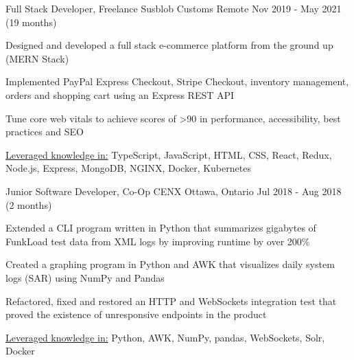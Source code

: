 \begin{cventries}
{\begin{cvitems}
		\end{cvitems}
	}
	\cventry
	{Full Stack Developer, Freelance}
	{Susblob Customs}
	{Remote}
	{Nov 2019 - May 2021 (19 months)}
	{
		\begin{cvitems}
			\item{Designed and developed a full stack e-commerce platform from the ground up (MERN Stack)}
			\item{Implemented PayPal Express Checkout, Stripe Checkout, inventory management, orders and shopping cart using an Express REST API}
			\item{Tune core web vitals to achieve scores of >90 in performance, accessibility, best practices and SEO}
			\item{\underline{Leveraged knowledge in:} TypeScript, JavaScript, HTML, CSS, React, Redux, Node.js, Express, MongoDB, NGINX, Docker, Kubernetes}
		\end{cvitems}
	}
	\cventry
	{Junior Software Developer, Co-Op}
	{CENX}
	{Ottawa, Ontario}
	{Jul 2018 - Aug 2018 (2 months)}
	{
		\begin{cvitems}
			\item{Extended a CLI program written in Python that summarizes gigabytes of FunkLoad test data from XML logs by improving runtime by over 200\%}
			\item{Created a graphing program in Python and AWK that visualizes daily system logs (SAR) using NumPy and Pandas}%
			\item{Refactored, fixed and restored an HTTP and WebSockets integration test that proved the existence of unresponsive endpoints in the product}
			\item{\underline{Leveraged knowledge in:} Python, AWK, NumPy, pandas, WebSockets, Solr, Docker}
		\end{cvitems}
	}
\end{cventries}
